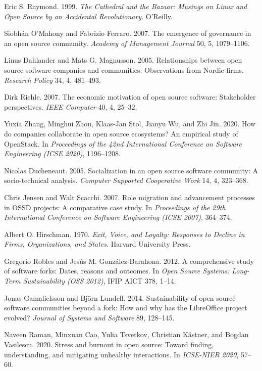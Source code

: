 
Eric S. Raymond. 1999. \emph{The Cathedral and the Bazaar: Musings on Linux and Open Source by an Accidental Revolutionary}. O'Reilly.

Siobh\'an O'Mahony and Fabrizio Ferraro. 2007. The emergence of governance in an open source community. \emph{Academy of Management Journal} 50, 5, 1079--1106.

Linus Dahlander and Mats G. Magnusson. 2005. Relationships between open source software companies and communities: Observations from Nordic firms. \emph{Research Policy} 34, 4, 481--493.

Dirk Riehle. 2007. The economic motivation of open source software: Stakeholder perspectives. \emph{IEEE Computer} 40, 4, 25--32.

Yuxia Zhang, Minghui Zhou, Klaas-Jan Stol, Jianyu Wu, and Zhi Jin. 2020. How do companies collaborate in open source ecosystems? An empirical study of OpenStack. In \emph{Proceedings of the 42nd International Conference on Software Engineering (ICSE 2020)}, 1196--1208.

Nicolas Ducheneaut. 2005. Socialization in an open source software community: A socio-technical analysis. \emph{Computer Supported Cooperative Work} 14, 4, 323--368.

Chris Jensen and Walt Scacchi. 2007. Role migration and advancement processes in OSSD projects: A comparative case study. In \emph{Proceedings of the 29th International Conference on Software Engineering (ICSE 2007)}, 364--374.

Albert O. Hirschman. 1970. \emph{Exit, Voice, and Loyalty: Responses to Decline in Firms, Organizations, and States}. Harvard University Press.

Gregorio Robles and Jes\'us M. Gonz\'alez-Barahona. 2012. A comprehensive study of software forks: Dates, reasons and outcomes. In \emph{Open Source Systems: Long-Term Sustainability (OSS 2012)}, IFIP AICT 378, 1--14.

Jonas Gamalielsson and Bj\"orn Lundell. 2014. Sustainability of open source software communities beyond a fork: How and why has the LibreOffice project evolved? \emph{Journal of Systems and Software} 89, 128--145.

Naveen Raman, Minxuan Cao, Yulia Tsvetkov, Christian K\"astner, and Bogdan Vasilescu. 2020. Stress and burnout in open source: Toward finding, understanding, and mitigating unhealthy interactions. In \emph{ICSE-NIER 2020}, 57--60.

